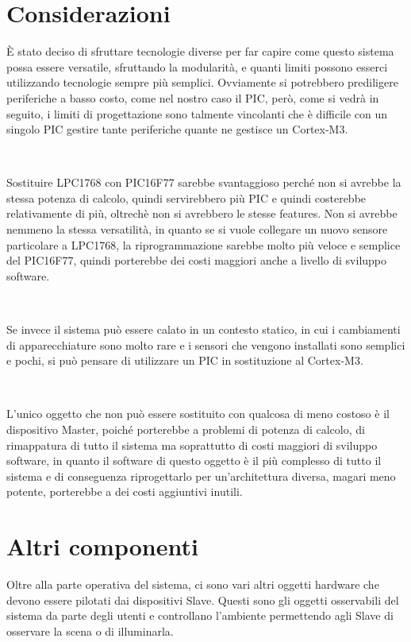 \documentclass[a4paper,titlepage]{book}
\begin{document}
\newpage
\section{Considerazioni}

È stato deciso di sfruttare tecnologie diverse per far capire come questo sistema possa essere versatile, sfruttando la modularità, e quanti limiti possono esserci utilizzando tecnologie sempre più semplici. Ovviamente si potrebbero prediligere periferiche a basso costo, come nel nostro caso il PIC, però, come si vedrà in seguito, i limiti di progettazione sono talmente vincolanti che è difficile con un singolo PIC gestire tante periferiche quante ne gestisce un Cortex-M3.

~

Sostituire LPC1768 con PIC16F77 sarebbe svantaggioso perché non si avrebbe la stessa potenza di calcolo, quindi servirebbero più PIC e quindi costerebbe relativamente di più, oltrechè non si avrebbero le stesse features. Non si avrebbe nemmeno la stessa versatilità, in quanto se si vuole collegare un nuovo sensore particolare a LPC1768, la riprogrammazione sarebbe molto più veloce e semplice del PIC16F77, quindi porterebbe dei costi maggiori anche a livello di sviluppo software.

~

Se invece il sistema può essere calato in un contesto statico, in cui i cambiamenti di apparecchiature sono molto rare e i sensori che vengono installati sono semplici e pochi, si può pensare di utilizzare un PIC in sostituzione al Cortex-M3.

~

L'unico oggetto che non può essere sostituito con qualcosa di meno costoso è il dispositivo Master, poiché porterebbe a problemi di potenza di calcolo, di rimappatura di tutto il sistema ma soprattutto di costi maggiori di sviluppo software, in quanto il software di questo oggetto è il più complesso di tutto il sistema e di conseguenza riprogettarlo per un'architettura diversa, magari meno potente, porterebbe a dei costi aggiuntivi inutili. 



\section{Altri componenti}

Oltre alla parte operativa del sistema, ci sono vari altri oggetti hardware che devono essere pilotati dai dispositivi Slave. Questi sono gli oggetti osservabili del sistema da parte degli utenti e controllano l'ambiente permettendo agli Slave di osservare la scena o di illuminarla.
\end{document}

